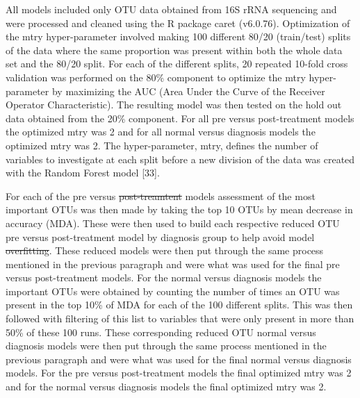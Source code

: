 \documentclass[12pt,]{article}
\providecommand{\DIFaddtex}[1]{{\protect\color{blue}\uwave{#1}}} %
\providecommand{\DIFdeltex}[1]{{\protect\color{red}\sout{#1}}}                      %
\providecommand{\DIFaddbegin}{} %
\providecommand{\DIFaddend}{} %
\providecommand{\DIFdelbegin}{} %
\providecommand{\DIFdelend}{} %
\providecommand{\DIFadd}[1]{\texorpdfstring{\DIFaddtex{#1}}{#1}} %
\providecommand{\DIFdel}[1]{\texorpdfstring{\DIFdeltex{#1}}{}} %
\begin{document}
All models included only OTU data obtained from 16S rRNA sequencing and
were processed and cleaned using the R package caret (v6.0.76).
Optimization of the mtry hyper-parameter involved making 100 different
80/20 (train/test) splits of the data where the same proportion was
present within both the whole data set and the 80/20 split. For each of
the different splits, 20 repeated 10-fold cross validation was performed
on the 80\% component to optimize the mtry hyper-parameter by maximizing
the AUC (Area Under the Curve of the Receiver Operator Characteristic).
The resulting model was then tested on the hold out data obtained from
the 20\% component. For all pre versus post-treatment models the
optimized mtry was 2 and for all normal versus diagnosis models the
optimized mtry was 2. The hyper-parameter, mtry, defines the number of
variables to investigate at each split before a new division of the data
was created with the Random Forest model {[}33{]}.

For each of the pre versus \DIFdelbegin \DIFdel{post-treamtent }\DIFdelend \DIFaddbegin \DIFadd{post-treatment }\DIFaddend models assessment of the most
important OTUs was then made by taking the top 10 OTUs by mean decrease
in accuracy (MDA). These were then used to build each respective reduced
OTU pre versus post-treatment model by diagnosis group to help avoid
model \DIFdelbegin \DIFdel{overfitting}\DIFdelend \DIFaddbegin \DIFadd{over-fitting}\DIFaddend . These reduced models were then put through the same
process mentioned in the previous paragraph and were what was used for
the final pre versus post-treatment models. For the normal versus
diagnosis models the important OTUs were obtained by counting the number
of times an OTU was present in the top 10\% of MDA for each of the 100
different splits. This was then followed with filtering of this list to
variables that were only present in more than 50\% of these 100 runs.
These corresponding reduced OTU normal versus diagnosis models were then
put through the same process mentioned in the previous paragraph and
were what was used for the final normal versus diagnosis models. For the
pre versus post-treatment models the final optimized mtry was 2 and for
the normal versus diagnosis models the final optimized mtry was 2.
\end{document}
